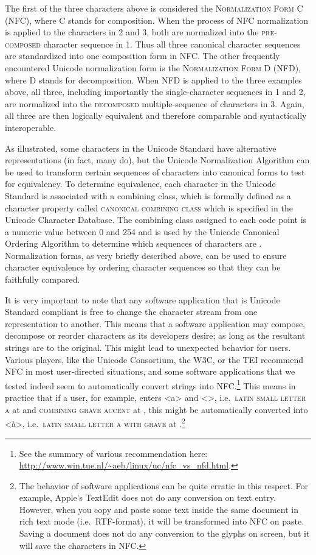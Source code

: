 The first of the three characters above is considered the \textsc{Normalization
Form C (NFC)}, where \textsc{C} stands for composition. When the process of NFC
normalization is applied to the characters in 2 and 3, both 
are normalized into the \textsc{pre-composed} character sequence in 1. Thus all
three canonical character sequences are standardized into one composition form
in NFC. The other frequently encountered Unicode normalization form is the
\textsc{Normalization Form D (NFD)}, where \textsc{D} stands for decomposition.
When NFD is applied to the three examples above, all three, including
importantly the single-character sequences in 1 and 2, are normalized into the
\textsc{decomposed} multiple-sequence of characters in 3. Again, all three are
then logically equivalent and therefore comparable and syntactically
interoperable.

As illustrated, some characters in the Unicode Standard have alternative
representations (in fact, many do), but the Unicode Normalization Algorithm can
be used to transform certain sequences of characters into canonical
forms to test for equivalency. To determine equivalence, each
character in the Unicode Standard is associated with a combining class, which is
formally defined as a character property called \textsc{canonical combining
class} which is specified in the Unicode Character Database. The combining class
assigned to each code point is a numeric value between 0 and 254 and is used by
the Unicode Canonical Ordering Algorithm to determine which sequences of
characters are . Normalization forms, as very briefly
described above, can be used to ensure character equivalence by ordering
character sequences so that they can be faithfully compared.

It is very important to note that any software application that is Unicode
Standard compliant is free to change the character stream from one
representation to another. This means that a software application may compose,
decompose or reorder characters as its developers desire; as long as the
resultant strings are  to the original. This might lead to
unexpected behavior for users. Various players, like the Unicode Consortium, the
W{\large 3}C, or the TEI recommend NFC in most user-directed situations, and
some software applications that we tested indeed seem to automatically convert
strings into NFC.\footnote{See the summary of various recommendation here:
\url{http://www.win.tue.nl/~aeb/linux/uc/nfc_vs_nfd.html}.} This means in
practice that if a user, for example, enters <a> and <>, i.e.~\textsc{latin
small letter a} at  and \textsc{combining grave accent} at ,
this might be automatically converted into <à>, i.e.~\textsc{latin small letter
a with grave} at .\footnote{The behavior of software applications can
be quite erratic in this respect. For example, Apple's TextEdit does not do any
conversion on text entry. However, when you copy and paste some text inside the
same document in rich text mode (i.e.~RTF-format), it will be transformed into
NFC on paste. Saving a document does not do any conversion to the glyphs on
screen, but it will save the characters in NFC.}


